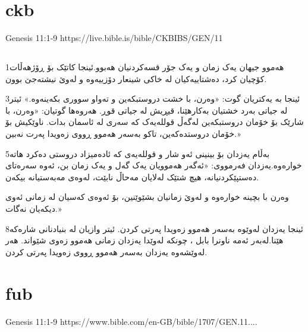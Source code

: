 \documentclass[12pt,fleqn,titlepage,twoside,a4paper]{book}
\begin{document}
\section{ckb}

 Genesis 11:1-9 https://live.bible.is/bible/CKBIBS/GEN/11

\begin{arab}[utf]

\section*{}

1هەموو جیهان یەک زمان و یەک جۆر قسەکردنیان هەبوو.ئینجا کاتێک بۆ ڕۆژهەڵات کۆچیان کرد، دەشتاییەکیان لە خاکی شینعار
دۆزییەوە و لەوێ نیشتەجێ بوون.

3ئینجا بە یەکتریان گوت: «وەرن، با خشت دروستبکەین و تەواو سووری بکەینەوە.» ئیتر لە جیاتی بەرد خشتیان بەکارهێنا، قیڕیش لە جیاتی قوڕ.
هەروەها گوتیان: «وەرن، با شارێک بۆ خۆمان دروستبکەین لەگەڵ قوللەیەک کە سەری لە ئاسمان بدات. ناوێکیش بۆ خۆمان دروستدەکەین، تاکو بەسەر هەموو ڕووی زەویدا پەرت نەبین.»

5بەڵام یەزدان بۆ بینینی ئەو شار و قوللەیەی کە ئادەمیزاد دروستی دەکرد هاتە خوارەوە.یەزدان فەرمووی: «ئەگەر هەموویان یەک گەل و یەک زمان بن، ئەوە سەرەتای دەستپێکردنیانە، هیچ شتێک لەلایان مەحاڵ نابێت، لەوەی مەبەستیانە بیکەن.

وەرن با بچینە خوارەوە و لەوێ زمانیان بشێوێنین، بۆ ئەوەی کەسیان لە زمانی ئەوی دیکەیان نەگات.»

8ئینجا یەزدان لەوێوە بەسەر هەموو زەویدا پەرتی کردن. ئیتر وازیان لە بنیادنانی شارەکە هێنا.لەبەر ئەمە ناونرا بابل
، چونکە لەوێدا یەزدان زمانی هەموو زەوی شێواند. هەر لەوێشەوە یەزدان بەسەر هەموو ڕووی زەویدا پەرتی کردن.

\end{arab}


\section{fub}

Genesis 11:1-9 https://www.bible.com/en-GB/bible/1707/GEN.11....
\end{document}
